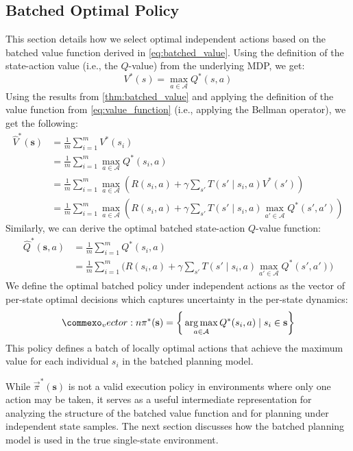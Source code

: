 \subsection{Batched Optimal Policy}
This section details how we select optimal independent actions based on the batched value function derived in \cref{eq:batched_value}.
Using the definition of the state-action value (i.e., the $Q$-value) from the underlying MDP, we get:
\begin{equation}
    V^*(s) = \max_{a \in \mathcal{A}} Q^*(s, a)
\end{equation}
Using the results from \cref{thm:batched_value} and applying the definition of the value function from \cref{eq:value_function} (i.e., applying the Bellman operator), we get the following:
\begin{align}
    \widehat{V}^*(\mathbf{s}) 
    &= \frac{1}{m} \sum_{i=1}^m V^*(s_i) \\
    &= \frac{1}{m} \sum_{i=1}^m \max_{a \in \mathcal{A}} Q^*(s_i, a) \\
    &= \frac{1}{m} \sum_{i=1}^m \max_{a \in \mathcal{A}} \left( R(s_i, a) + \gamma \sum_{s'} T(s' \mid s_i, a) V^*(s') \right) \\
    &= \frac{1}{m} \sum_{i=1}^m \max_{a \in \mathcal{A}} \left( R(s_i, a) + \gamma \sum_{s'} T(s' \mid s_i, a) \max_{a' \in \mathcal{A}} Q^*(s', a') \right)
\end{align}
Similarly, we can derive the optimal batched state-action $Q$-value function:
\begin{align}
    \widehat{Q}^*(\mathbf{s}, a) &= \frac{1}{m} \sum_{i=1}^m Q^*(s_i, a) \label{eq:batched_q_value} \\
        &= \frac{1}{m} \sum_{i=1}^m \bigg( R(s_i, a) + \gamma \sum_{s'} T(s' \mid s_i, a) \max_{a' \in \mathcal{A}} Q^*(s', a') \bigg)
\end{align}
We define the optimal batched policy under independent actions as the vector of per-state optimal decisions which captures uncertainty in the per-state dynamics:
\begin{equation}
    \vec{\pi}^*(\mathbf{s}) = \bigg\{ \argmax_{a \in \mathcal{A}} Q^*(s_i, a) \mid s_i \in \mathbf{s} \bigg\}
\end{equation}
This policy defines a batch of locally optimal actions that achieve the maximum value for each individual $s_i$ in the batched planning model.

While $\vec{\pi}^*(\mathbf{s})$ is not a valid execution policy in environments where only one action may be taken, it serves as a useful intermediate representation for analyzing the structure of the batched value function and for planning under independent state samples.
The next section discusses how the batched planning model is used in the true single-state environment.


